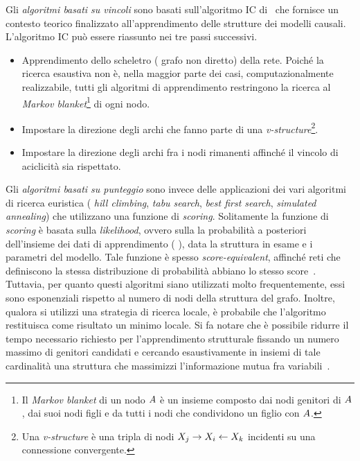 Gli \emph{algoritmi basati su vincoli} sono basati sull'algoritmo \acf{IC} di~\citet{Verma1991} che fornisce un contesto teorico finalizzato all'apprendimento delle strutture dei modelli causali. L'algoritmo \acs{IC} può essere riassunto nei tre passi successivi.
\begin{itemize}
    \item Apprendimento dello scheletro (\ie{} grafo non diretto) della rete. Poiché la ricerca esaustiva non è, nella maggior parte dei casi, computazionalmente realizzabile, tutti gli algoritmi di apprendimento restringono la ricerca al \emph{Markov blanket}\footnote{\label{note:markov-blanket}Il \emph{Markov blanket} di un nodo $\mathnormal{A}$ è un insieme composto dai nodi genitori di $\mathnormal{A}$, dai suoi nodi figli e da tutti i nodi che condividono un figlio con $\mathnormal{A}$.} di ogni nodo.
    \item Impostare la direzione degli archi che fanno parte di una \emph{v-structure}\footnote{Una \emph{v-structure} è una tripla di nodi $\mathnormal{X}_j\rightarrow\mathnormal{X}_i\leftarrow\mathnormal{X}_k$ incidenti su una connessione convergente.}.
    \item Impostare la direzione degli archi fra i nodi rimanenti affinché il vincolo di aciclicità sia rispettato.
\end{itemize}

Gli \emph{algoritmi basati su punteggio} sono invece delle applicazioni dei vari algoritmi di ricerca euristica (\eg{} \emph{hill climbing}, \emph{tabu search}, \emph{best first search}, \emph{simulated annealing}) che utilizzano una funzione di \emph{scoring}. Solitamente la funzione di \emph{scoring} è basata sulla \emph{likelihood}, ovvero sulla la probabilità a posteriori dell'insieme dei dati di apprendimento (\ie{} \emph{\trs{}}), data la struttura in esame e i parametri del modello. Tale funzione è spesso \emph{score-equivalent}, affinché reti che definiscono la stessa distribuzione di probabilità abbiano lo stesso score~\citep{Chickering2013}. Tuttavia, per quanto questi algoritmi siano utilizzati molto frequentemente, essi sono esponenziali rispetto al numero di nodi della struttura del grafo. Inoltre, qualora si utilizzi una strategia di ricerca locale, è probabile che l'algoritmo restituisca come risultato un minimo locale. Si fa notare che è possibile ridurre il tempo necessario richiesto per l'apprendimento strutturale fissando un numero massimo di genitori candidati e cercando esaustivamente in insiemi di tale cardinalità una struttura che massimizzi l'informazione mutua fra variabili~\citep[][]{Heckerman1995}.

